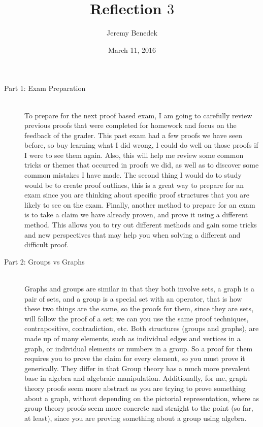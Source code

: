 \documentclass{article}
\title{Reflection $3$}
\author{Jeremy Benedek}
\date{March 11, 2016}
\begin{document}
\maketitle

\begin{description}
	\item[Part 1: Exam Preparation] \hfill \\
	 	To prepare for the next proof based exam, I am going to 
		carefully review previous proofs that were completed for homework
		and focus on the feedback of the grader. This past exam had a few proofs we have seen before, so buy learning what I did wrong,
		I could do well on those proofs if I were to see them again. Also, this will help me review some common tricks or themes
		that occurred in proofs we did, as well as to discover some common mistakes I have made.
		The second thing I would do to study would be to create proof outlines, this is a great way to 
		prepare for an exam since you are thinking about specific proof structures that you are likely to see on the exam. Finally, another
		method to prepare for an exam is to take a claim we have already proven, and prove it using a different method. This allows you
		to try out different methods and gain some tricks and new perspectives that may help you when solving a different and difficult proof. 

	\item[Part 2: Groups vs Graphs] \hfil \\
		Graphs and groups are similar in that they both involve sets, a graph is a pair of sets, and a group is a special set with an operator,
		that is how these two things are the same, so the proofs for them, since they are sets, will follow the proof of a set; we can
		you use the same proof techniques, contrapositive, contradiction, etc. 
		Both structures (groups and graphs), are made up of many elements, such as individual edges and vertices in a graph, or individual
		elements or numbers in a group. So a proof for them requires you to prove the claim for every element, so you must prove it 
		generically. 
		They differ in that Group theory has a much more prevalent base in algebra and algebraic manipulation. 
		Additionally, for me, graph theory proofs seem more abstract as you are trying to prove something about a graph, without depending on 
		the pictorial representation, where as group theory proofs seem more concrete and straight to the point (so far, at least), since
		you are proving something about a group using algebra. 


\end{description}
\end{document}
